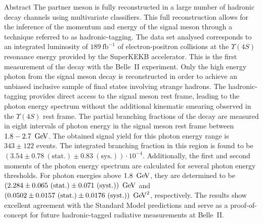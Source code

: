 \begin{abstractpage}{Abstract}
    The partner \B meson is fully reconstructed in a large number of hadronic decay channels using multivariate classifiers. 
    This full reconstruction allows for the inference of the momentum and energy of the signal \B meson through a technique referred to as hadronic-tagging.
    The data set analysed corresponds to an integrated luminosity of $189~\mathrm{fb}^{-1}$ of electron-positron collisions at the $\Upsilon(4S)$ resonance energy provided by the SuperKEKB accelerator. 
    This is the first measurement of the \BtoXsgamma decay with the Belle~II experiment.
    Only the high energy photon from the signal \B meson decay is reconstructed in order to achieve an unbiased inclusive sample of final states involving strange hadrons. 
    The hadronic-tagging provides direct access to the signal \B meson rest frame, leading to the photon energy spectrum without the additional kinematic smearing observed in the $\Upsilon(4S)$ rest frame.
    The partial branching fractions of the \BtoXsgamma decay are measured in eight intervals of photon energy in the signal \B meson rest frame between $1.8-2.7~\mathrm{\,Ge\kern -0.1em V}$. 
    The obtained signal yield for this photon energy range is $343 \pm 122$ events. 
    The integrated branching fraction in this region is found to be $(3.54 \pm 0.78~(\mathrm{stat.}) \pm 0.83~(\mathrm{sys.}))\cdot10^{-4}$.
    Additionally, the first and second moments of the photon energy spectrum are calculated for several photon energy thresholds. 
    For photon energies above $1.8~\mathrm{\,Ge\kern -0.1em V}$, they are determined to be $(2.284 \pm 0.065~(\mathrm{stat.})\pm 0.071~(\mathrm{syst.}))~\mathrm{\,Ge\kern -0.1em V}$ and $(0.0502 \pm 0.0157~(\mathrm{stat.}) \pm 0.0176~(\mathrm{syst.}))~\mathrm{\,Ge\kern -0.1em V}^2$, respectively.
    The results show excellent agreement with the Standard Model predictions and serve as a proof-of-concept for future hadronic-tagged radiative measurements at Belle~II.
    \end{abstractpage}

